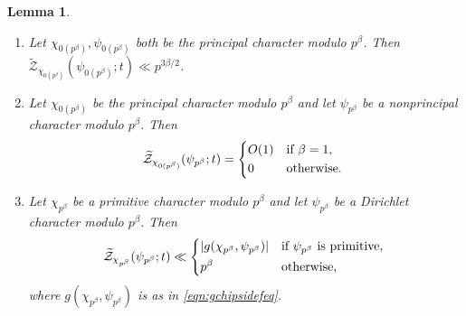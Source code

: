 \documentclass[11pt,a4paper]{amsart}
\newcommand{\ZZ}{\mathcal{Z}}
\numberwithin{equation}{section}
\newtheorem{lemma}[equation]{Lemma}
\theoremstyle{remark}
\theoremstyle{definition}
\begin{document}
\begin{lemma}\hspace{1em}
\label{lem:tildeZbounds}
\begin{enumerate}[leftmargin=*,label=\textup{(\arabic*)}]
\item\label{lemno:tildeZboundsprincprinc} Let $\chi_{0(p^{\beta})},\psi_{0(p^{\beta})}$ both be the principal character modulo $p^{\beta}$. Then $\widetilde{\ZZ}_{\chi_{0(p^{\beta})}}(\psi_{0(p^{\beta})};t) \ll p^{3\beta/2}$.
\item\label{lemno:tildeZboundsprincnonprinc} Let $\chi_{0(p^{\beta})}$ be the principal character modulo $p^{\beta}$ and let $\psi_{p^{\beta}}$ be a nonprincipal character modulo $p^{\beta}$. Then
\[\widetilde{\ZZ}_{\chi_{0(p^{\beta})}}(\psi_{p^{\beta}};t) = \begin{dcases*}
O(1) & if $\beta = 1$,	\\
0 & otherwise.
\end{dcases*}\]
\item\label{lemno:tildeZboundsprimarb} Let $\chi_{p^{\beta}}$ be a primitive character modulo $p^{\beta}$ and let $\psi_{p^{\beta}}$ be a Dirichlet character modulo $p^{\beta}$. Then
\[\widetilde{\ZZ}_{\chi_{p^{\beta}}}(\psi_{p^{\beta}};t) \ll \begin{dcases*}
|g(\chi_{p^{\beta}},\psi_{p^{\beta}})| & if $\psi_{p^{\beta}}$ is primitive,	\\
p^{\beta} & otherwise,
\end{dcases*}\]
where $g(\chi_{p^{\beta}},\psi_{p^{\beta}})$ is as in \eqref{eqn:gchipsidefeq}.
\end{enumerate}
\end{lemma}
\end{document}

